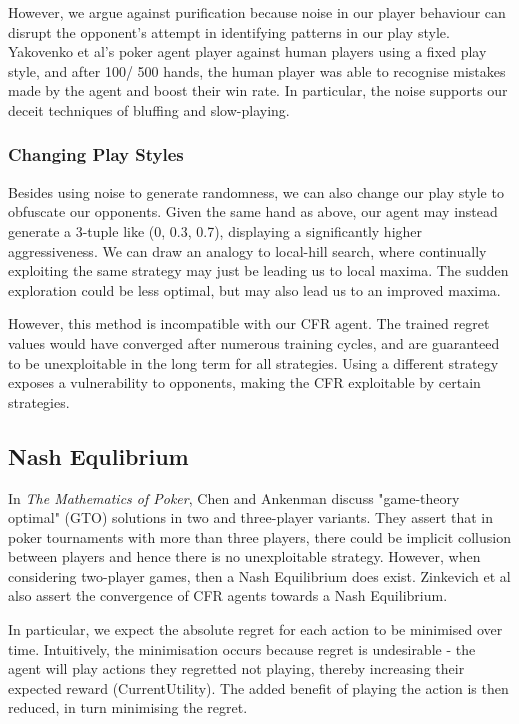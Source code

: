 \documentclass{article}
\begin{document}
However, we argue against purification because noise in our player behaviour can disrupt the opponent's attempt in identifying patterns in our play style. Yakovenko et al's poker agent player against human players using a fixed play style, and after 100/ 500 hands, the human player was able to recognise mistakes made by the agent and boost their win rate. In particular, the noise supports our deceit techniques of bluffing and slow-playing.

\subsubsection{Changing Play Styles}
Besides using noise to generate randomness, we can also change our play style to obfuscate our opponents. Given the same hand as above, our agent may instead generate a 3-tuple like (0, 0.3, 0.7), displaying a significantly higher aggressiveness. We can draw an analogy to local-hill search, where continually exploiting the same strategy may just be leading us to local maxima. The sudden exploration could be less optimal, but may also lead us to an improved maxima.

However, this method is incompatible with our CFR agent. The trained regret values would have converged after numerous training cycles, and are guaranteed to be unexploitable in the long term for all strategies. Using a different strategy exposes a vulnerability to opponents, making the CFR exploitable by certain strategies.

\subsection{Nash Equlibrium}

In \textit{The Mathematics of Poker}, Chen and Ankenman discuss "game-theory optimal" (GTO) solutions in two and three-player variants. They assert that in poker tournaments with more than three players, there could be implicit collusion between players and hence there is no unexploitable strategy. However, when considering two-player games, then a Nash Equilibrium does exist. Zinkevich et al also assert the convergence of CFR agents towards a Nash Equilibrium.

In particular, we expect the absolute regret for each action to be minimised over time. Intuitively, the minimisation occurs because regret is undesirable - the agent will play actions they regretted not playing, thereby increasing their expected reward (CurrentUtility). The added benefit of playing the action is then reduced, in turn minimising the regret.
\end{document}
